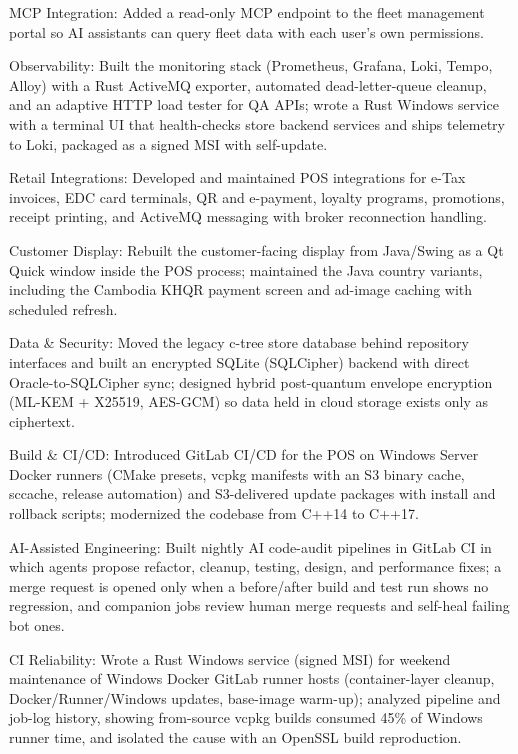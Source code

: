 \begin{cventries}
{\begin{cvitems}
      \item {MCP Integration: Added a read-only MCP endpoint to the fleet management portal so AI assistants can query fleet data with each user's own permissions.}
      \item {Observability: Built the monitoring stack (Prometheus, Grafana, Loki, Tempo, Alloy) with a Rust ActiveMQ exporter, automated dead-letter-queue cleanup, and an adaptive HTTP load tester for QA APIs; wrote a Rust Windows service with a terminal UI that health-checks store backend services and ships telemetry to Loki, packaged as a signed MSI with self-update.}
      \item {Retail Integrations: Developed and maintained POS integrations for e-Tax invoices, EDC card terminals, QR and e-payment, loyalty programs, promotions, receipt printing, and ActiveMQ messaging with broker reconnection handling.}
      \item {Customer Display: Rebuilt the customer-facing display from Java/Swing as a Qt Quick window inside the POS process; maintained the Java country variants, including the Cambodia KHQR payment screen and ad-image caching with scheduled refresh.}
      \item {Data \& Security: Moved the legacy c-tree store database behind repository interfaces and built an encrypted SQLite (SQLCipher) backend with direct Oracle-to-SQLCipher sync; designed hybrid post-quantum envelope encryption (ML-KEM + X25519, AES-GCM) so data held in cloud storage exists only as ciphertext.}
      \item {Build \& CI/CD: Introduced GitLab CI/CD for the POS on Windows Server Docker runners (CMake presets, vcpkg manifests with an S3 binary cache, sccache, release automation) and S3-delivered update packages with install and rollback scripts; modernized the codebase from C++14 to C++17.}
      \item {AI-Assisted Engineering: Built nightly AI code-audit pipelines in GitLab CI in which agents propose refactor, cleanup, testing, design, and performance fixes; a merge request is opened only when a before/after build and test run shows no regression, and companion jobs review human merge requests and self-heal failing bot ones.}
      \item {CI Reliability: Wrote a Rust Windows service (signed MSI) for weekend maintenance of Windows Docker GitLab runner hosts (container-layer cleanup, Docker/Runner/Windows updates, base-image warm-up); analyzed pipeline and job-log history, showing from-source vcpkg builds consumed 45\% of Windows runner time, and isolated the cause with an OpenSSL build reproduction.}

\end{cvitems}}
\end{cventries}
